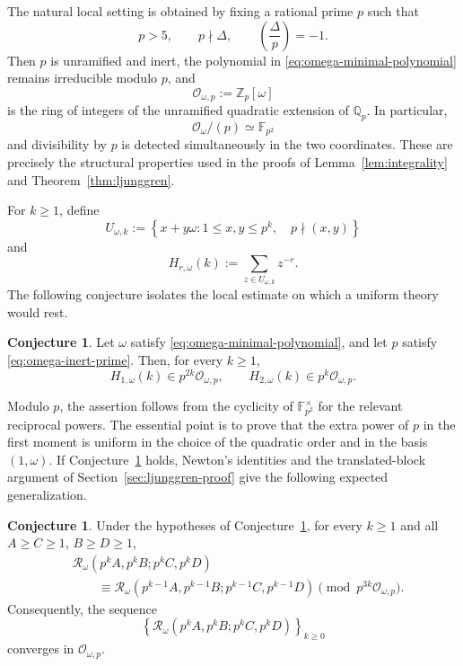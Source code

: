 \documentclass[a4paper,american,11pt]{amsart}
\numberwithin{equation}{section}
\theoremstyle{definition}
\newtheorem{conjecture}[theorem]{Conjecture}
\newcommand{\Z}{\mathbb Z}
\newcommand{\F}{\mathbb F}
\begin{document}
The natural local setting is obtained by fixing a rational prime $p$ such that
\begin{equation}\label{eq:omega-inert-prime}
p>5,
\qquad
p\nmid\Delta,
\qquad
\left(\frac{\Delta}{p}\right)=-1.
\end{equation}
Then $p$ is unramified and inert, the polynomial in \eqref{eq:omega-minimal-polynomial}
remains irreducible modulo $p$, and
\[
\mathcal O_{\omega,p}:=\Z_p[\omega]
\]
is the ring of integers of the unramified quadratic extension of $\mathbb Q_p$.
In particular,
\[
\mathcal O_\omega/(p)\simeq\F_{p^2}
\]
and divisibility by $p$ is detected simultaneously in the two coordinates.  These are
precisely the structural properties used in the proofs of Lemma~\ref{lem:integrality}
and Theorem~\ref{thm:ljunggren}.

For $k\geq1$, define
\[
U_{\omega,k}
:=
\left\{
 x+y\omega:
 1\leq x,y\leq p^k,
 \quad p\nmid(x,y)
\right\}
\]
and
\[
H_{r,\omega}(k)
:=
\sum_{z\in U_{\omega,k}}z^{-r}.
\]
The following conjecture isolates the local estimate on which a uniform theory would rest.

\begin{conjecture}\label{conj:omega-moments}
Let $\omega$ satisfy \eqref{eq:omega-minimal-polynomial}, and let $p$ satisfy
\eqref{eq:omega-inert-prime}.  Then, for every $k\geq1$,
\[
H_{1,\omega}(k)\in p^{2k}\mathcal O_{\omega,p},
\qquad
H_{2,\omega}(k)\in p^k\mathcal O_{\omega,p}.
\]
\end{conjecture}

Modulo $p$, the assertion follows from the cyclicity of $\F_{p^2}^{\times}$ for the
relevant reciprocal powers.  The essential point is to prove that the extra power of
$p$ in the first moment is uniform in the choice of the quadratic order and in the
basis $(1,\omega)$.  If Conjecture~\ref{conj:omega-moments} holds, Newton's identities
and the translated-block argument of Section~\ref{sec:ljunggren-proof} give the
following expected generalization.

\begin{conjecture}
\label{conj:omega-ljunggren}
Under the hypotheses of Conjecture~\ref{conj:omega-moments}, for every $k\geq1$ and
all $A\geq C\geq1$, $B\geq D\geq1$,
\[
\begin{aligned}
&\mathcal R_\omega(p^kA,p^kB;p^kC,p^kD)
\\
&\qquad\equiv
\mathcal R_\omega
(p^{k-1}A,p^{k-1}B;p^{k-1}C,p^{k-1}D)
\pmod{p^{3k}\mathcal O_{\omega,p}}.
\end{aligned}
\]
Consequently, the sequence
\[
\left\{
\mathcal R_\omega(p^kA,p^kB;p^kC,p^kD)
\right\}_{k\geq0}
\]
converges in $\mathcal O_{\omega,p}$.
\end{conjecture}
\end{document}
